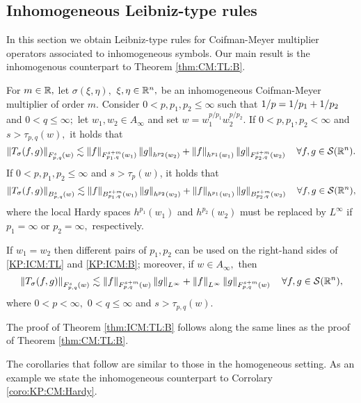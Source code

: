{ \subsection{Inhomogeneous Leibniz-type rules}
 In this section we obtain Leibniz-type rules for Coifman-Meyer multiplier operators associated to inhomogeneous symbols. Our main result is the inhomogenous counterpart to Theorem \ref{thm:CM:TL:B}. 
 
\begin{theorem}\label{thm:ICM:TL:B}  For $m \in \re,$ let $\sigma(\xi,\eta),$ $\xi,\eta\in\rn,$ be an inhomogeneous Coifman-Meyer multiplier of order $m.$ Consider  $0 < p, p_1, p_2  \le \infty$  such that $\hcline$ and  $0 < q \leq \infty;$ let  $w_1,w_2\in A_\infty$ and set $w=w_1^{{p}/{p_1}} w_2^{{p}/{p_2}}.$ 
If $0 < p,p_1,p_2 < \infty$ and  $s > \tau_{p,q}(w),$  it holds that
\begin{equation}\label{KP:ICM:TL}
\norm{T_\sigma(f,g)}{\itlw{p}{s}{q}{w}} \lesssim \norm{f}{\itlw{p_1}{s+m}{q}{w_1}} \norm{g}{h^{p_2}(w_2)} +  \norm{f}{h^{p_1}(w_1)}   \norm{g}{\itlw{p_2}{s+m}{q}{w_2}} \quad \forall f, g \in \sw.
\end{equation}
If $0< p, p_1,p_2\leq \infty$ and $s > \tau_p(w)$, it holds that
\begin{equation}\label{KP:ICM:B}
\norm{T_\sigma(f,g)}{\ibesw{p}{s}{q}{w}} \lesssim \norm{f}{\ibesw{p_1}{s+m}{q}{w_1} } \norm{g}{h^{p_2}(w_2)} +  \norm{f}{h^{p_1}(w_1)}   \norm{g}{\ibesw{p_2}{s+m}{q}{w_2} } \quad \forall f, g \in \sw,
\end{equation}
where the local Hardy spaces $h^{p_1}(w_1)$ and $h^{p_2}(w_2)$ must be replaced by $L^\infty$ if $p_1=\infty$ or $p_2=\infty,$ respectively.

If $w_1=w_2$ then different pairs of $p_1, p_2$ can be used on the right-hand sides of \eqref{KP:ICM:TL} and \eqref{KP:ICM:B}; moreover, if $w\in A_\infty,$ then 
\begin{equation*}
\norm{T_\sigma(f,g)}{\itlw{p}{s}{q}{w}} \lesssim \norm{f}{\itlw{p}{s+m}{q}{w} } \norm{g}{L^\infty} +  \norm{f}{L^\infty}   \norm{g}{\itlw{p}{s+m}{q}{w}} \quad \forall f, g \in \sw,
\end{equation*}
where $0<p<\infty,$ $0<q\le\infty$ and $s>\tau_{p,q}(w).$
\end{theorem} 

The proof of Theorem \ref{thm:ICM:TL:B} follows along the same lines as the proof of Theorem \ref{thm:CM:TL:B}. 
 
The corollaries that follow are similar to those in the homogeneous setting. As an example we state the inhomogeneous counterpart to Corrolary \ref{coro:KP:CM:Hardy}.
 
}
